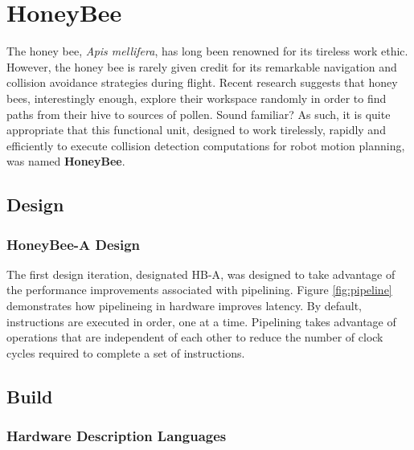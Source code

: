 \newpage

\section{HoneyBee}

    

    The honey bee, \textit{Apis mellifera}, has long been renowned for its tireless work ethic. However, the honey bee is rarely given credit for its remarkable navigation and collision avoidance strategies during flight. Recent research\cite{Menzel2005} suggests that honey bees, interestingly enough, explore their workspace randomly in order to find paths from their hive to sources of pollen. Sound familiar? As such, it is quite appropriate that this functional unit, designed to work tirelessly, rapidly and efficiently to execute collision detection computations for robot motion planning, was named \textbf{HoneyBee}. \\


    \subsection{Design}
        \subsubsection*{HoneyBee-A Design}
        The first design iteration, designated \gls{HB-A}, was designed to take advantage of the performance improvements associated with pipelining. Figure \ref{fig:pipeline} demonstrates how pipelineing in hardware improves latency. By default, instructions are executed in order, one at a time. Pipelining takes advantage of operations that are independent of each other to reduce the number of clock cycles required to complete a set of instructions. 
        
 

    \subsection{Build}
        \subsubsection*{Hardware Description Languages}

